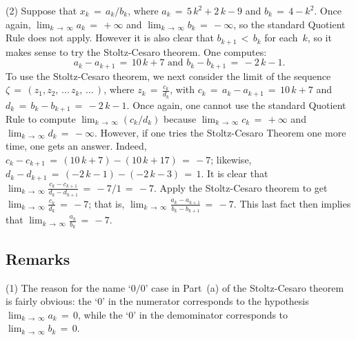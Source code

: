        (2) Suppose that $x_{k} \,=\, a_{k}/b_{k}$, where $a_{k} \,=\, 5\,k^{2} + 2\,k - 9$ and $b_{k} \,=\, 4 - k^{2}$.
    Once again, $\lim_{k \,{\rightarrow}\, {\infty}} a_{k} \,=\, +{\infty}$ and $\lim_{k \,{\rightarrow}\, {\infty}} b_{k} \,=\, -{\infty}$,
    so the standard Quotient Rule does not apply. However it is also clear that $b_{k+1}\,<\,b_{k}$ for each~$k$,
    so it makes sense to try the Stoltz-Cesaro theorem. One computes:
        \begin{displaymath}
        a_{k} - a_{k+1} \,=\, 10\,k + 7 \mbox{ and } 
        b_{k} - b_{k+1} \,=\, -2\,k-1.
        \end{displaymath}
    To use the Stoltz-Cesaro theorem, we next consider the limit of the sequence ${\zeta} \,=\, (z_{1}, z_{2},\,{\ldots}\,z_{k},\,{\ldots}\,)$,
    where ${\displaystyle z_{k} \,=\, \frac{c_{k}}{d_{k}}}$, with $c_{k} \,=\, a_{k}-a_{k+1} \,=\, 10\,k + 7$ and $d_{k} \,=\, b_{k}-b_{k+1} \,=\, -2\,k-1$.
    Once again, one cannot use the standard Quotient Rule to compute $\lim_{k \,{\rightarrow}\, {\infty}} (c_{k}/d_{k})$
    because $\lim_{k \,{\rightarrow}\, {\infty}} c_{k} \,=\, +{\infty}$ and $\lim_{k \,{\rightarrow}\, {\infty}} d_{k} \,=\, -{\infty}$.
    However, if one tries the Stoltz-Cesaro Theorem one more time, one gets an answer.
    Indeed, $c_{k}-c_{k+1} \,=\, (10\,k + 7) - (10\,k + 17) \,=\, -7$; likewise, $d_{k}-d_{k+1} \,=\, (-2\,k -1) - (-2\,k - 3) \,=\, 1$.
    It is clear that ${\displaystyle \lim_{k \,{\rightarrow}\, {\infty}} \frac{c_{k}-c_{k+1}}{d_{k}- d_{k+1}} \,=\, -7/1 \,=\, -7}$.
    Apply the Stoltz-Cesaro theorem to get ${\displaystyle \lim_{k \,{\rightarrow}\, {\infty}} \frac{c_{k}}{d_{k}} \,=\, -7}$;
    that is, ${\displaystyle \lim_{k \,{\rightarrow}\, {\infty}} \frac{a_{k}-a_{k+1}}{b_{k}-b_{k+1}} \,=\, -7}$.
    This last fact then implies that ${\displaystyle \lim_{k \,{\rightarrow}\, {\infty}} \frac{a_{k}}{b_{k}} \,=\, -7}$.


\V


            \subsection{\small{\bf Remarks}}
            \label{RemrkC60.55C}

\V

\hspace*{\parindent}(1) The reason for the name `$0/0$' case in Part~(a) of the Stoltz-Cesaro theorem is fairly obvious:
    the `$0$' in the numerator corresponds to the hypothesis $\lim_{k \,{\rightarrow}\, {\infty}} a_{k} \,=\, 0$,
    while the `$0$' in the demominator corresponds to $\lim_{k \,{\rightarrow}\, {\infty}} b_{k} \,=\, 0$.

